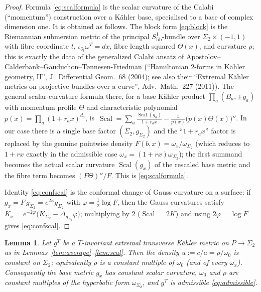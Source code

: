 \documentclass{amsart}
\newtheorem{lemma}{Lemma}
\theoremstyle{definition}
\DeclareMathOperator{\Scal}{Scal}
\begin{document}
\begin{proof}
Formula \eqref{eq:scalformula} is the scalar curvature of the Calabi
(``momentum'') construction over a K\"ahler base, specialised to a base of
complex dimension one. It is obtained as follows. The block form
\eqref{eq:block} is the Riemannian submersion metric of the principal
$S^1_{\mathrm{fib}}$-bundle over $\Sigma_2\times(-1,1)$ with fibre coordinate
$t$, $\iota_{\partial_t}\omega^T=dx$, fibre length squared $\Theta(x)$, and
curvature $\rho$; this is exactly the data of the generalized Calabi ansatz of
Apostolov--Calderbank--Gauduchon--T\o nnesen-Friedman (``Hamiltonian $2$-forms
in K\"ahler geometry, II'', J.\ Differential Geom.\ 68 (2004); see also their
``Extremal K\"ahler metrics on projective bundles over a curve'', Adv.\ Math.\
227 (2011)). The general scalar-curvature formula there, for a base K\"ahler
product $\prod_a(B_a,\pm g_a)$ with momentum profile $\Theta$ and characteristic
polynomial $p(x)=\prod_a(1+ r_a x)^{d_a}$, is
$\,\Scal=\sum_a \frac{\Scal(g_a)}{1+r_a x}-\frac1{p(x)}\bigl(p(x)\Theta(x)\bigr)''$.
In our case there is a single base factor $(\Sigma_2,g_{\Sigma_2})$ and the
``$1+r_ax$'' factor is replaced by the genuine pointwise density
$F(b,x)=\omega_x/\omega_{\Sigma_2}$ (which reduces to $1+rx$ exactly in the
admissible case $\omega_x=(1+rx)\omega_{\Sigma_2}$); the first summand becomes
the actual scalar curvature $\Scal(g_x)$ of the rescaled base metric and the
fibre term becomes $(F\Theta)''/F$. This is \eqref{eq:scalformula}.

Identity \eqref{eq:confscal} is the conformal change of Gauss curvature on a
surface: if $g_x=F\,g_{\Sigma_2}=e^{2\varphi}g_{\Sigma_2}$ with
$\varphi=\tfrac12\log F$, then the Gauss curvatures satisfy
$K_x=e^{-2\varphi}\bigl(K_{\Sigma_2}-\Delta_{g_{\Sigma_2}}\varphi\bigr)$;
multiplying by $2$ ($\Scal=2K$) and using $2\varphi=\log F$ gives
\eqref{eq:confscal}.
\end{proof}

\begin{lemma}\label{lem:baseCSC}
Let $g^T$ be a $T$-invariant \emph{extremal} transverse K\"ahler metric on
$P\to\Sigma_2$ as in Lemmas~\ref{lem:average}--\ref{lem:scal}. Then the density
$u:=c/a=\rho/\omega_0$ is constant on $\Sigma_2$; equivalently $\rho$ is a
constant multiple of $\omega_0$ (and of every $\omega_x$). Consequently the base
metric $g_x$ has constant scalar curvature, $\omega_0$ and $\rho$ are constant
multiples of the hyperbolic form $\omega_{\Sigma_2}$, and $g^T$ is admissible
\eqref{eq:admissible}.
\end{lemma}
\end{document}
